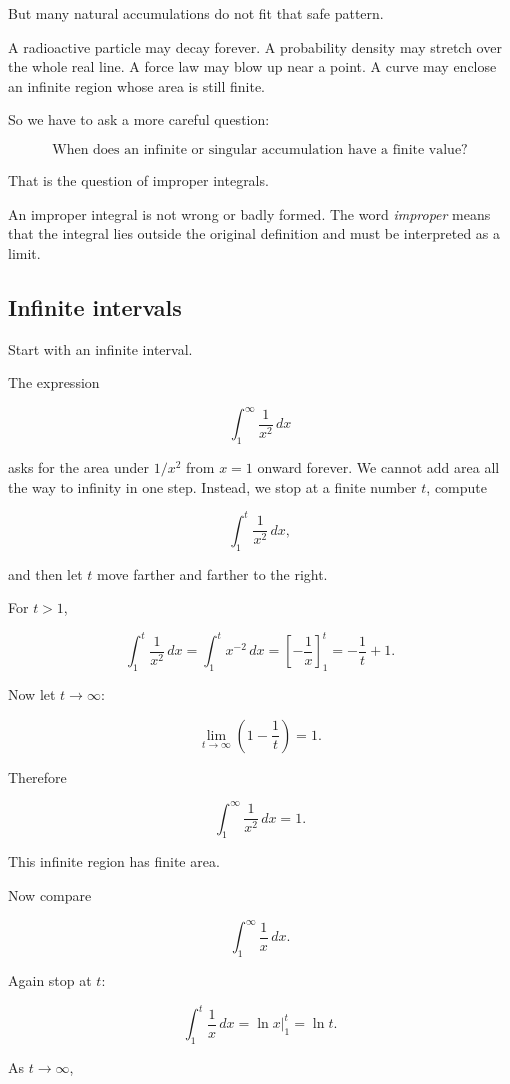 But many natural accumulations do not fit that safe pattern.

A radioactive particle may decay forever.  A probability density may stretch over the
whole real line.  A force law may blow up near a point.  A curve may enclose an infinite
region whose area is still finite.

So we have to ask a more careful question:

\[
\boxed{
\text{When does an infinite or singular accumulation have a finite value?}
}
\]

That is the question of improper integrals.

An improper integral is not wrong or badly formed.  The word \emph{improper} means
that the integral lies outside the original definition and must be interpreted as a limit.

\subsection{Infinite intervals}
\label{subsec:infinite-intervals}

Start with an infinite interval.

The expression

\[
\int_1^\infty \frac{1}{x^2}\,dx
\]

asks for the area under \(1/x^2\) from \(x=1\) onward forever.  We cannot add area all
the way to infinity in one step.  Instead, we stop at a finite number \(t\), compute

\[
\int_1^t \frac{1}{x^2}\,dx,
\]

and then let \(t\) move farther and farther to the right.

For \(t>1\),

\[
\int_1^t \frac{1}{x^2}\,dx
=
\int_1^t x^{-2}\,dx
=
\left[-\frac1x\right]_1^t
=
-\frac1t+1.
\]

Now let \(t\to\infty\):

\[
\lim_{t\to\infty}\left(1-\frac1t\right)=1.
\]

Therefore

\[
\boxed{
\int_1^\infty \frac{1}{x^2}\,dx=1.
}
\]

This infinite region has finite area.

Now compare

\[
\int_1^\infty \frac1x\,dx.
\]

Again stop at \(t\):

\[
\int_1^t \frac1x\,dx
=
\ln x\Big|_1^t
=
\ln t.
\]

As \(t\to\infty\),

